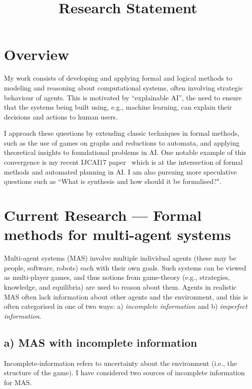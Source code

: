 \documentclass[10pt,a4paper,sans]{moderncv}
\title{Research Statement}
\begin{document}
\makecvtitle



\section{Overview}
My work consists of developing and applying formal and logical methods to modeling and reasoning about computational systems, often involving strategic behaviour of agents. 
This is motivated by ``explainable AI'', the need to ensure that the systems being built using, e.g.,  machine learning, can explain their decisions and actions to human users. 
\newline

I approach these questions by extending classic techniques in formal methods, such as the use of games on graphs and reductions to automata, and applying theoretical insights to foundational problems in AI. One notable example of this convergence is my recent IJCAI17 paper~\cite{BDGR17} which is at the intersection of formal methods and automated planning in AI. I am also pursuing more speculative questions such as ``What is synthesis and how should it be formalised?".
\newline


\section{Current Research --- Formal methods for multi-agent systems}
Multi-agent systems (MAS) involve multiple individual agents (these may be people, software, robots) each with their own goals. Such systems can be viewed as multi-player games, and thus notions from game-theory (e.g., strategies, knowledge, and equilibria) are used to reason about them. Agents in realistic MAS often lack information about other agents and the environment, and this is often categorised in one of two ways: a) \emph{incomplete information} and b) \emph{imperfect information}.
\newline

\subsection{a) MAS with incomplete information}
Incomplete-information refers to uncertainty about the environment (i.e., the structure of the game). I have considered two sources of incomplete information for MAS.
\newline
\end{document}

